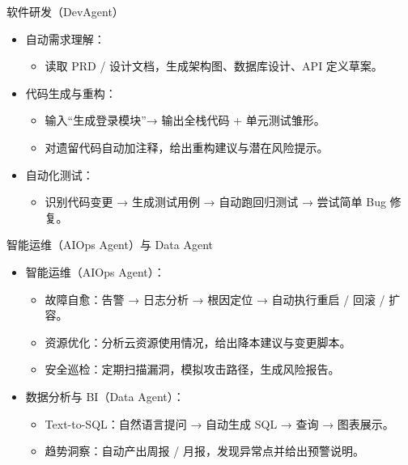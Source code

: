 \documentclass[10pt,aspectratio=169]{beamer}
\begin{document}
\begin{frame}{软件研发（DevAgent）}
  \begin{itemize}
    \item 自动需求理解：
      \begin{itemize}
        \item 读取 PRD / 设计文档，生成架构图、数据库设计、API 定义草案。
      \end{itemize}
    \item 代码生成与重构：
      \begin{itemize}
        \item 输入“生成登录模块”→ 输出全栈代码 + 单元测试雏形。
        \item 对遗留代码自动加注释，给出重构建议与潜在风险提示。
      \end{itemize}
    \item 自动化测试：
      \begin{itemize}
        \item 识别代码变更 → 生成测试用例 → 自动跑回归测试 → 尝试简单 Bug 修复。
      \end{itemize}
  \end{itemize}
\end{frame}

\begin{frame}{智能运维（AIOps Agent）与 Data Agent}
  \begin{itemize}
    \item 智能运维（AIOps Agent）：
      \begin{itemize}
        \item 故障自愈：告警 → 日志分析 → 根因定位 → 自动执行重启 / 回滚 / 扩容。
        \item 资源优化：分析云资源使用情况，给出降本建议与变更脚本。
        \item 安全巡检：定期扫描漏洞，模拟攻击路径，生成风险报告。
      \end{itemize}
    \item 数据分析与 BI（Data Agent）：
      \begin{itemize}
        \item Text-to-SQL：自然语言提问 → 自动生成 SQL → 查询 → 图表展示。
        \item 趋势洞察：自动产出周报 / 月报，发现异常点并给出预警说明。
      \end{itemize}
  \end{itemize}
\end{frame}
\end{document}
